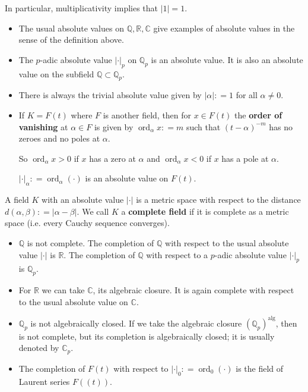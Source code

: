 \documentclass{article}
\newcommand{\term}{\textbf}
\newcommand{\dfn}{\mathrel{\mathop:}=}
\newcommand{\QQ}{\mathbb{Q}}
\DeclareMathOperator{\ord}{ord}
\newcommand{\examplesymbol}{$\blacktriangle$}
\renewcommand{\qedsymbol}{$\blacksquare$}
\theoremstyle{myplain}
\theoremstyle{mydefinition}
\newenvironment{example}
  {\pushQED{\qed}\renewcommand{\qedsymbol}{\examplesymbol}\examplex}
  {\popQED\endexamplex}
\begin{document}
In particular, multiplicativity implies that $|1| = 1$.

\begin{example}
  \begin{itemize}
  \item The usual absolute values on $\QQ, \mathbb{R}, \mathbb{C}$ give examples
    of absolute values in the sense of the definition above.

  \item The $p$-adic absolute value $|\cdot|_p$ on $\QQ_p$ is an absolute
    value. It is also an absolute value on the subfield $\QQ \subset \QQ_p$.

  \item There is always the trivial absolute value given by $|\alpha| \dfn 1$
    for all $\alpha \ne 0$.

  \item If $K = F(t)$ where $F$ is another field, then for $x \in F(t)$ the
    \term{order of vanishing} at $\alpha \in F$ is given by
    $\ord_\alpha x \dfn m$ such that $(t-\alpha)^{-m}$ has no zeroes and no
    poles at $\alpha$.

    So $\ord_\alpha x > 0$ if $x$ has a zero at $\alpha$ and $\ord_\alpha x < 0$
    if $x$ has a pole at $\alpha$.

    $|\cdot|_\alpha \dfn \ord_\alpha (\cdot)$ is an absolute value on
    $F(t)$. \qedhere
  \end{itemize}
\end{example}

A field $K$ with an absolute value $|\cdot|$ is a metric space with respect to
the distance $d (\alpha,\beta) \dfn |\alpha - \beta|$. We call $K$ a
\term{complete field} if it is complete as a metric space (i.e. every Cauchy
sequence converges).

\begin{example}
  \begin{itemize}
  \item $\QQ$ is not complete. The completion of $\QQ$ with respect to the usual
    absolute value $|\cdot|$ is $\mathbb{R}$. The completion of $\QQ$ with
    respect to a $p$-adic absolute value $|\cdot|_p$ is $\QQ_p$.

  \item For $\mathbb{R}$ we can take $\mathbb{C}$, its algebraic closure. It is
    again complete with respect to the usual absolute value on $\mathbb{C}$.

  \item $\QQ_p$ is not algebraically closed. If we take the algebraic closure
    $(\QQ_p)^\mathrm{alg}$, then is not complete, but its completion is
    algebraically closed; it is usually denoted by $\mathbb{C}_p$.

  \item The completion of $F (t)$ with respect to
    $|\cdot|_0 \dfn \ord_0 (\cdot)$ is the field of Laurent series
    $F (\!(t)\!)$. \qedhere
  \end{itemize}
\end{example}
\end{document}
